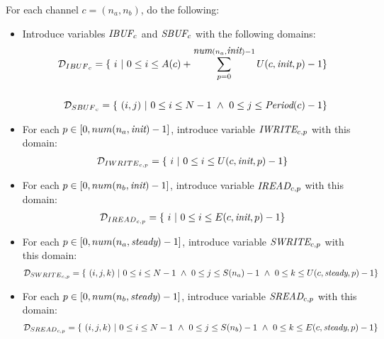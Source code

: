For each channel $c = (n_a, n_b)$, do the following:
\begin{itemize}

\item Introduce variables $\mbox{\it IBUF}_c$ and $\mbox{\it SBUF}_c$ with the following domains:
\begin{align*}
{\cal D}_{{IBUF}_c} = \{~i~|~0 \le i \le A(c) +
\sum_{p=0}^{\mt{num}(n_a, \mt{init})-1} U(c, \mt{init}, p) - 1 \} \\ ~ \\
%
{\cal D}_{{SBUF}_c} = \{ ~(i,j)~|~0 \le i \le N - 1 ~\wedge~ 0 \le j \le \mt{Period}(c) - 1\}
\end{align*}

\item For each $p \in [0, num(n_a, \mbox{\it init})-1]$, introduce
variable $\mbox{\it IWRITE}_{c, p}$ with this domain:
\begin{align*}
{\cal D}_{{IWRITE}_{c, p}} = \{~i~|~0 \le i \le U(c, \mbox{\it init}, p) - 1\} \\
\end{align*}

\item For each $p \in [0, num(n_b, \mbox{\it init})-1]$, introduce
variable $\mbox{\it IREAD}_{c, p}$ with this domain:
\begin{align*}
{\cal D}_{{IREAD}_{c, p}} = \{~i~|~0 \le i \le E(c, \mbox{\it init}, p) - 1\} \\
\end{align*}

\item For each $p \in [0, num(n_a, \mbox{\it steady})-1]$, introduce
variable $\mbox{\it SWRITE}_{c, p}$ with this domain:
\begin{align*}
{\cal D}_{{SWRITE}_{c, p}} = \{~(i,j,k)~|~0 \le i \le N-1 ~\wedge~ 0 \le j \le S(n_a) - 1 ~\wedge~ 0 \le k \le U(c, \mbox{\it steady}, p) - 1\} \\
\end{align*}

\item For each $p \in [0, num(n_b, \mbox{\it steady})-1]$, introduce
variable $\mbox{\it SREAD}_{c, p}$ with this domain:
\begin{align*}
{\cal D}_{{SREAD}_{c, p}} = \{~(i,j,k)~|~0 \le i \le N-1 ~\wedge~ 0 \le j \le S(n_b) - 1 ~\wedge~ 0 \le k \le E(c, \mbox{\it steady}, p) - 1\} \\
\end{align*}

\end{itemize}

